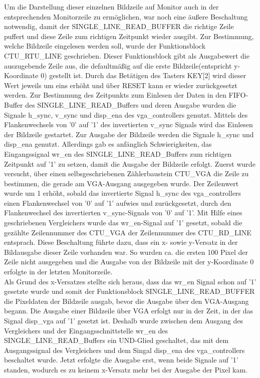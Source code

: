 \documentclass[ngerman,12pt]{article} %
\begin{document}
{Um die Darstellung dieser einzelnen Bildzeile auf Monitor auch in der entsprechenden Monitorzeile zu ermöglichen, war noch eine äußere Beschaltung notwendig, damit der SINGLE\_LINE\_READ\_BUFFER die richtige Zeile puffert und diese Zeile zum richtigen Zeitpunkt wieder ausgibt. Zur Bestimmung, welche Bildzeile eingelesen werden soll, wurde der Funktionsblock CTU\_RTU\_LINE geschrieben. Dieser Funktionsblock gibt als Ausgabewert die auszugebende Zeile aus, die defaultmäßig auf die erste Bildzeile(entspricht y-Koordinate 0) gestellt ist. Durch das Betätigen des Tasters KEY[2] wird dieser Wert jeweils um eins erhöht und über RESET kann er wieder zurückgesetzt werden. Zur Bestimmung des Zeitpunkts zum Einlesen der Daten in den FIFO-Buffer des SINGLE\_LINE\_READ\_Buffers und deren Ausgabe wurden die Signale h\_sync, v\_sync und disp\_ena des vga\_controllers genutzt. Mittels des Flankenwechsels von '0' auf '1' des invertierten v\_sync Signals wird das Einlesen der Bildzeile gestartet. Zur Ausgabe der Bildzeile werden die Signale h\_sync und disp\_ena genutzt. Allerdings gab es anfänglich Schwierigkeiten, das Eingangssignal wr\_en des SINGLE\_LINE\_READ\_Buffers zum richtigen Zeitpunkt auf '1' zu setzen, damit die Ausgabe der Bildzeile erfolgt. Zuerst wurde versucht, über einen selbsgeschriebenen Zählerbaustein CTU\_VGA die Zeile zu bestimmen, die gerade am VGA-Ausgang ausgegeben wurde. Der Zeilenwert wurde um 1 erhöht, sobald das invertierte Signal h\_sync des vga\_controllers einen Flankenwechsel von '0' auf '1' aufwies und zurückgesetzt, durch den Flankenwechsel des invertierten v\_sync-Signals von '0' auf '1'. Mit Hilfe eines geschriebenen Vergleichers wurde das wr\_en-Signal auf '1' gesetzt, sobald die gezählte Zeilennummer des CTU\_VGA der Zeilennummer des CTU\_RD\_LINE entsprach. Diese Beschaltung führte dazu, dass ein x- sowie y-Versatz in der Bildausgabe dieser Zeile vorhanden war. So wurden ca. die ersten 100 Pixel der Zeile nicht ausgegeben und die Ausgabe von der Bildzeile mit der y-Koordinate 0 erfolgte in der letzten Monitorzeile.\\

Als Grund des x-Versatzes stellte sich heraus, dass das wr\_en Signal schon auf '1' gesetzte wurde und somit der Funktionsblock SINGLE\_LINE\_READ\_BUFFER die Pixeldaten der Bildzeile  ausgab, bevor die Ausgabe über den VGA-Ausgang begann. Die Ausgabe einer Bildzeile über VGA erfolgt nur in der Zeit, in der das Signal disp\_vga auf '1' gesetzt ist. Deshalb wurde zwischen dem Ausgang des Vergleichers und der Eingangsschnittstelle wr\_en des SINGLE\_LINE\_READ\_Buffers ein UND-Glied geschaltet, das mit dem Ausgangssignal des Vergleichers und dem Singal disp\_ena des vga\_controllers beschaltet wurde. Jetzt erfolgte die Ausgabe erst, wenn beide Signale auf '1' standen, wodurch es zu keinem x-Versatz mehr bei der Ausgabe der Pixel kam.\newline

}
\end{document}
